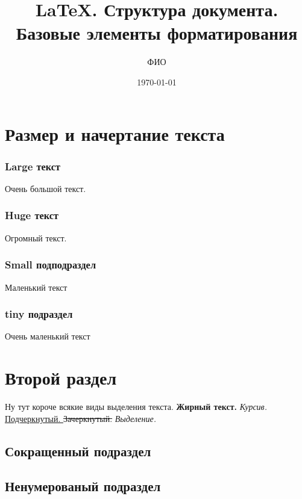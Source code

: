 \documentclass[a4paper,14 pt]{article}
\author{ФИО}
\title{\LaTeX. Структура документа. Базовые элементы форматирования}
\date{\today}
\begin{document}



\tableofcontents

\section{Размер и начертание текста}

\label{sec:text}

\subsubsection{Large текст}

\Large Очень большой текст.

\subsubsection{Huge текст}

\begin{huge}
  Огромный текст.
\end{huge}

\subsubsection{Small подподраздел}

\small Маленький текст

\subsubsection{tiny подраздел}

\begin{tiny}
  Очень маленький текст
\end{tiny}

\section{Второй раздел}

Ну тут короче всякие виды выделения текста. \textbf{ Жирный текст.} \textit{Курсив. } \underline{Подчеркнутый. } \st{Зачеркнутый. } \emph{Выделение. }

\subsection[Подраздельчик]{Сокращенный подраздел}

\subsection*{Ненумерованый подраздел}
\end{document}
